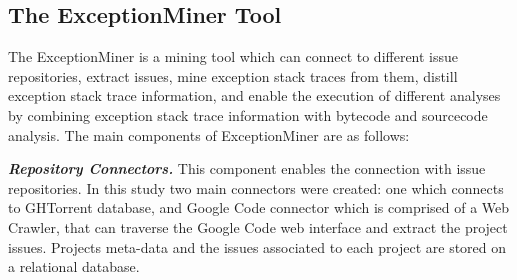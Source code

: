 \documentclass[conference]{IEEEtran}
\begin{document}




\subsection{The ExceptionMiner Tool}
\label{sec:exceptionminer}

The ExceptionMiner is a mining tool which can connect to different issue repositories, 
extract issues, mine exception stack traces from them, distill exception stack trace information,
and enable the execution of different analyses by combining exception stack 
trace information with bytecode and sourcecode analysis. The main components of ExceptionMiner are as follows:

\emph{\textbf{Repository Connectors.}} This component enables the connection 
with issue repositories. In this study two main connectors were created: one which connects to 
GHTorrent database, and Google Code connector which is comprised of a Web Crawler,
 that can traverse the Google Code web interface and extract the project issues. 
Projects meta-data and the issues associated to each project are stored on a relational 
database.
\end{document}
